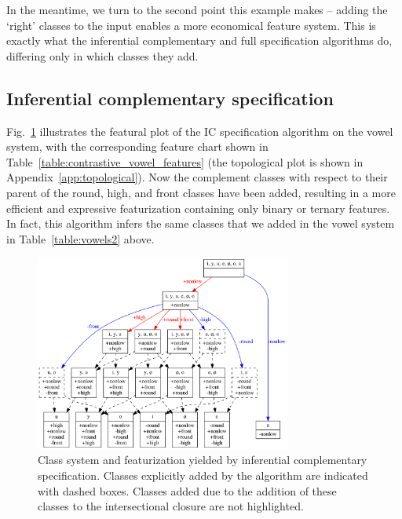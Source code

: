 \documentclass[12pt, oneside]{article}   	%
\begin{document}
In the meantime, we turn to the second point this example makes -- adding the `right' classes to the input enables a more economical feature system. This is exactly what the inferential complementary and full specification algorithms do, differing only in which classes they add.

\subsection{Inferential complementary specification}

Fig.~\ref{fig:contrastive} illustrates the featural plot of the IC specification algorithm on the vowel system, with the corresponding feature chart shown in Table~\ref{table:contrastive_vowel_features} (the topological plot is shown in Appendix~\ref{app:topological}). Now the complement classes with respect to their parent of the round, high, and front classes have been added, resulting in a more efficient and expressive featurization containing only binary or ternary features. In fact, this algorithm infers the same classes that we added in the vowel system in Table~\ref{table:vowels2} above.

\begin{figure}[htb!]
	\centering
	\includegraphics[width=0.75\textwidth]{vowel_inventory_contrastive_FEATURAL.png}
	\caption{Class system and featurization yielded by inferential complementary specification. Classes explicitly added by the algorithm are indicated with dashed boxes. Classes added due to the addition of these classes to the intersectional closure are not highlighted.}
	\label{fig:contrastive}
\end{figure}
\end{document}
